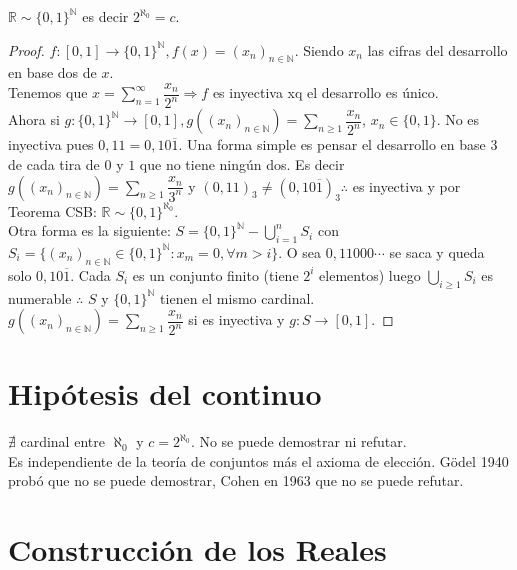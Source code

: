 \begin{theorem}
  $\mathbb{R} \sim \{ 0, 1 \}^\mathbb{N}$ es decir $2^{\aleph_0} = c$.
  \begin{proof}
    $f: [0, 1] \to \{ 0, 1 \}^\mathbb{N}, f(x) = (x_n)_{n \in \mathbb{N}}$. Siendo $x_n$ las cifras del desarrollo en base dos de $x$. \\
    Tenemos que $x = \sum_{n=1}^\infty \dfrac{x_n}{2^n} \Rightarrow f$ es inyectiva xq el desarrollo es único. \\
    Ahora si $g: \{ 0, 1 \}^\mathbb{N} \to [0, 1], g((x_n)_{n \in \mathbb{N}}) = \sum_{n \geq 1} \dfrac{x_n}{2^n}$, $x_n \in \{0, 1\}$. No es inyectiva pues $0,11 = 0,10\overline{1}$.
    Una forma simple es pensar el desarrollo en base $3$ de cada tira de $0$ y $1$ que no tiene ningún dos. Es decir $g((x_n)_{n \in \mathbb{N}}) = \sum_{n \geq 1} \dfrac{x_n}{3^n}$ y $(0,11)_3 \neq (0,10\overline{1})_3 \therefore$
    es inyectiva y por Teorema CSB: $\mathbb{R} \sim \{0,1\}^{\aleph_0}$. \\
    Otra forma es la siguiente:
    $S = \{0, 1\}^\mathbb{N} - \bigcup_{i=1}^n S_i$ con $S_i = \{ (x_n)_{n \in \mathbb{N}} \in \{0, 1\}^\mathbb{N} : x_m = 0, \forall m > i \}$. O sea $0,11000\cdots$ se saca y queda solo $0,10\overline{1}$.
    Cada $S_i$ es un conjunto finito (tiene $2^i$ elementos) luego $\bigcup_{i \geq 1} S_i$ es numerable $\therefore$ $S$ y $\{0,1\}^\mathbb{N}$ tienen el mismo cardinal. \\
    $g((x_n)_{n \in \mathbb{N}}) = \sum_{n \geq 1} \dfrac{x_n}{2^n}$ si es inyectiva y $g: S \to [0, 1]$.
  \end{proof}
\end{theorem}

\section{Hipótesis del continuo}

$\nexists$ cardinal entre $\aleph_0$ y $c = 2^{\aleph_0}$. No se puede demostrar ni refutar. \\
Es independiente de la teoría de conjuntos más el axioma de elección.
Gödel 1940 probó que no se puede demostrar, Cohen en 1963 que no se puede refutar.
\section{Construcción de los Reales}
